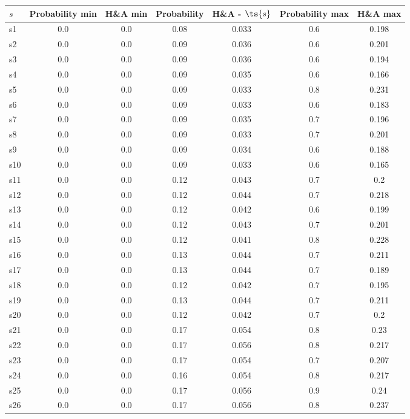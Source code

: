 \documentclass{article}
\begin{document}
\noindent\begin{tabular}{|l|c|c|c|c|c|c|}
\hline
$s$& Probability min & H\&A min & Probability & H\&A - $\ts{s}$ & Probability max & H\&A max\\
\hline
s1 &0.0 & 0.0 & 0.08 & 0.033 & 0.6 & 0.198\\
\hline
s2 &0.0 & 0.0 & 0.09 & 0.036 & 0.6 & 0.201\\
\hline
s3 &0.0 & 0.0 & 0.09 & 0.036 & 0.6 & 0.194\\
\hline
s4 &0.0 & 0.0 & 0.09 & 0.035 & 0.6 & 0.166\\
\hline
s5 &0.0 & 0.0 & 0.09 & 0.033 & 0.8 & 0.231\\
\hline
s6 &0.0 & 0.0 & 0.09 & 0.033 & 0.6 & 0.183\\
\hline
s7 &0.0 & 0.0 & 0.09 & 0.035 & 0.7 & 0.196\\
\hline
s8 &0.0 & 0.0 & 0.09 & 0.033 & 0.7 & 0.201\\
\hline
s9 &0.0 & 0.0 & 0.09 & 0.034 & 0.6 & 0.188\\
\hline
s10 &0.0 & 0.0 & 0.09 & 0.033 & 0.6 & 0.165\\
\hline
s11 &0.0 & 0.0 & 0.12 & 0.043 & 0.7 & 0.2\\
\hline
s12 &0.0 & 0.0 & 0.12 & 0.044 & 0.7 & 0.218\\
\hline
s13 &0.0 & 0.0 & 0.12 & 0.042 & 0.6 & 0.199\\
\hline
s14 &0.0 & 0.0 & 0.12 & 0.043 & 0.7 & 0.201\\
\hline
s15 &0.0 & 0.0 & 0.12 & 0.041 & 0.8 & 0.228\\
\hline
s16 &0.0 & 0.0 & 0.13 & 0.044 & 0.7 & 0.211\\
\hline
s17 &0.0 & 0.0 & 0.13 & 0.044 & 0.7 & 0.189\\
\hline
s18 &0.0 & 0.0 & 0.12 & 0.042 & 0.7 & 0.195\\
\hline
s19 &0.0 & 0.0 & 0.13 & 0.044 & 0.7 & 0.211\\
\hline
s20 &0.0 & 0.0 & 0.12 & 0.042 & 0.7 & 0.2\\
\hline
s21 &0.0 & 0.0 & 0.17 & 0.054 & 0.8 & 0.23\\
\hline
s22 &0.0 & 0.0 & 0.17 & 0.056 & 0.8 & 0.217\\
\hline
s23 &0.0 & 0.0 & 0.17 & 0.054 & 0.7 & 0.207\\
\hline
s24 &0.0 & 0.0 & 0.16 & 0.054 & 0.8 & 0.217\\
\hline
s25 &0.0 & 0.0 & 0.17 & 0.056 & 0.9 & 0.24\\
\hline
s26 &0.0 & 0.0 & 0.17 & 0.056 & 0.8 & 0.237\\

\end{tabular}
\end{document}
